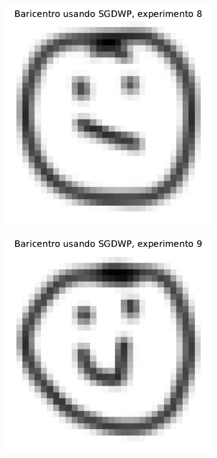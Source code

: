 \begin{figure}[H]
\begin{subfigure}[b]{0.17\textwidth}
        \label{fig:bar-SGDWP-exp-07}
    \end{subfigure}
    \hfill
    \begin{subfigure}[b]{0.17\textwidth}
        \centering
        \includegraphics[width=\textwidth]{img/sgdwp/bar-SGDWP-exp-08.pdf}
        \label{fig:bar-SGDWP-exp-08}
    \end{subfigure}
    \hfill
    \begin{subfigure}[b]{0.17\textwidth}
        \centering
        \includegraphics[width=\textwidth]{img/sgdwp/bar-SGDWP-exp-09.pdf}

\end{subfigure}
\end{figure}
